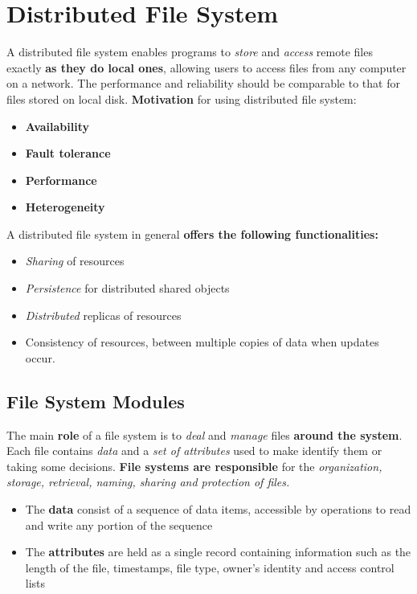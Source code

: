 \chapter{Distributed File System}
A distributed file system enables programs to \textit{store} and \textit{access} remote files exactly \textbf{as they do local ones}, allowing users to access files from any computer on a network. The performance and reliability should be comparable to that for files stored on local disk. \textbf{Motivation} for using distributed file system:
\begin{itemize}
    \item \textbf{Availability}
    \item \textbf{Fault tolerance}
    \item \textbf{Performance}
    \item \textbf{Heterogeneity}
\end{itemize}
A distributed file system in general \textbf{offers the following functionalities:}
\begin{itemize}
    \item \textit{Sharing} of resources
    \item \textit{Persistence} for distributed shared objects
    \item \textit{Distributed} replicas of resources
    \item Consistency of resources, between multiple copies of data when updates occur.
\end{itemize}

\section{File System Modules}
The main \textbf{role} of a file system is to \textit{deal} and \textit{manage} files \textbf{around the system}. Each file contains \textit{data} and a \textit{set of attributes} used to make identify them or taking some decisions. \textbf{File systems are responsible} for the \textit{organization, storage, retrieval, naming, sharing and protection of files.}
\begin{itemize}
    \item The \textbf{data} consist of a sequence of data items, accessible by operations to read and write any portion of the sequence
    \item The \textbf{attributes} are held as a single record containing information such as the length of the file, timestamps, file type, owner’s identity and access control lists
\end{itemize}

